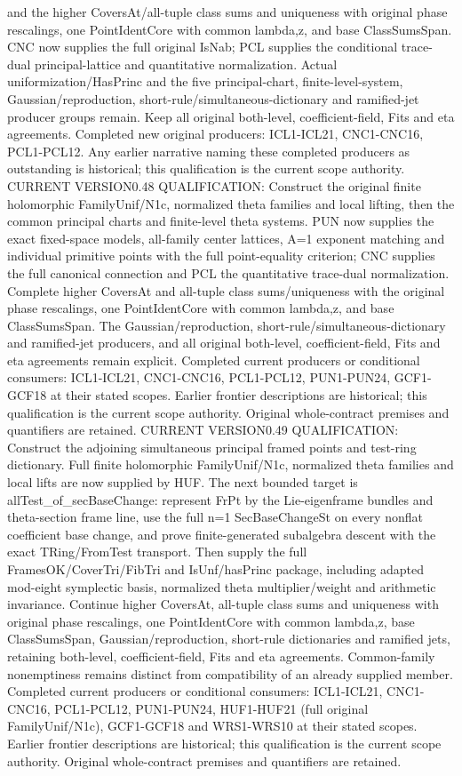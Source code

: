 \documentclass[11pt,a4paper]{article}
\numberwithin{equation}{section}
\theoremstyle{remark}\newtheorem{remark}[theorem]{Remark}
\begin{document}
and the higher CoversAt/all-tuple class sums and uniqueness with original phase rescalings, one PointIdentCore with common lambda,z, and base ClassSumsSpan. CNC now supplies the full original IsNab; PCL supplies the conditional trace-dual principal-lattice and quantitative normalization. Actual uniformization/HasPrinc and the five principal-chart, finite-level-system, Gaussian/reproduction, short-rule/simultaneous-dictionary and ramified-jet producer groups remain. Keep all original both-level, coefficient-field, Fits and eta agreements. Completed new original producers: ICL1-ICL21, CNC1-CNC16, PCL1-PCL12. Any earlier narrative naming these completed producers as outstanding is historical; this qualification is the current scope authority. CURRENT VERSION0.48 QUALIFICATION: Construct the original finite holomorphic FamilyUnif/N1c, normalized theta families and local lifting, then the common principal charts and finite-level theta systems. PUN now supplies the exact fixed-space models, all-family center lattices, A=1 exponent matching and individual primitive points with the full point-equality criterion; CNC supplies the full canonical connection and PCL the quantitative trace-dual normalization. Complete higher CoversAt and all-tuple class sums/uniqueness with the original phase rescalings, one PointIdentCore with common lambda,z, and base ClassSumsSpan. The Gaussian/reproduction, short-rule/simultaneous-dictionary and ramified-jet producers, and all original both-level, coefficient-field, Fits and eta agreements remain explicit. Completed current producers or conditional consumers: ICL1-ICL21, CNC1-CNC16, PCL1-PCL12, PUN1-PUN24, GCF1-GCF18 at their stated scopes. Earlier frontier descriptions are historical; this qualification is the current scope authority. Original whole-contract premises and quantifiers are retained. CURRENT VERSION0.49 QUALIFICATION: Construct the adjoining simultaneous principal framed points and test-ring dictionary. Full finite holomorphic FamilyUnif/N1c, normalized theta families and local lifts are now supplied by HUF. The next bounded target is allTest\_\allowbreak of\_\allowbreak secBaseChange: represent FrPt by the Lie-eigenframe bundles and theta-section frame line, use the full n=1 SecBaseChangeSt on every nonflat coefficient base change, and prove finite-generated subalgebra descent with the exact TRing/FromTest transport. Then supply the full FramesOK/CoverTri/FibTri and IsUnf/hasPrinc package, including adapted mod-eight symplectic basis, normalized theta multiplier/weight and arithmetic invariance. Continue higher CoversAt, all-tuple class sums and uniqueness with original phase rescalings, one PointIdentCore with common lambda,z, base ClassSumsSpan, Gaussian/reproduction, short-rule dictionaries and ramified jets, retaining both-level, coefficient-field, Fits and eta agreements. Common-family nonemptiness remains distinct from compatibility of an already supplied member. Completed current producers or conditional consumers: ICL1-ICL21, CNC1-CNC16, PCL1-PCL12, PUN1-PUN24, HUF1-HUF21 (full original FamilyUnif/N1c), GCF1-GCF18 and WRS1-WRS10 at their stated scopes. Earlier frontier descriptions are historical; this qualification is the current scope authority. Original whole-contract premises and quantifiers are retained.
\end{document}
